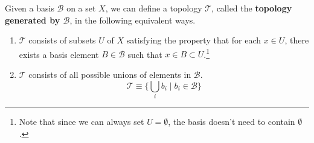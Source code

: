     \begin{theorem}
      Given a basis $\mathscr{B}$ on a set $X$, we can define a topology $\mathscr{T}$, called the \textbf{topology generated by $\mathscr{B}$}, in the following equivalent ways. 
      \begin{enumerate}
        \item $\mathscr{T}$ consists of subsets $U$ of $X$ satisfying the property that for each $x \in U$, there exists a basis element $B \in \mathscr{B}$ such that $x \in B \subset U$.\footnote{Note that since we can always set $U = \emptyset$, the basis doesn't need to contain $\emptyset$. }
        \begin{center}
        \end{center}

        \item $\mathscr{T}$ consists of all possible unions of elements in $\mathscr{B}$. 
        \begin{equation}
          \mathscr{T} \equiv \Big\{ \bigcup_i b_i \; \Big| \; b_i \in \mathscr{B}\Big\}
        \end{equation}
      \end{enumerate}
    \end{theorem} 
